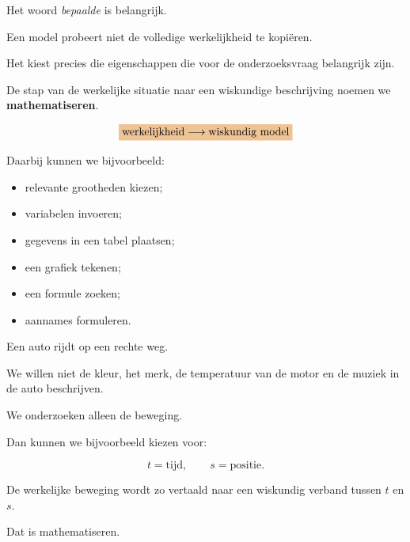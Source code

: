 \documentclass{ximera}
\begin{document}
Het woord \emph{bepaalde} is belangrijk.

Een model probeert niet de volledige werkelijkheid te kopiëren.

Het kiest precies die eigenschappen die voor de onderzoeksvraag
belangrijk zijn.




De stap van de werkelijke situatie naar een wiskundige beschrijving
noemen we \textbf{mathematiseren}.

\[
\important{
\text{werkelijkheid}
\longrightarrow
\text{wiskundig model}
}
\]

Daarbij kunnen we bijvoorbeeld:

\begin{itemize}
  \item relevante grootheden kiezen;
  \item variabelen invoeren;
  \item gegevens in een tabel plaatsen;
  \item een grafiek tekenen;
  \item een formule zoeken;
  \item aannames formuleren.
\end{itemize}


\begin{voorbeeld}

Een auto rijdt op een rechte weg.

We willen niet de kleur, het merk, de temperatuur van de motor en de
muziek in de auto beschrijven.

We onderzoeken alleen de beweging.

Dan kunnen we bijvoorbeeld kiezen voor:

\[
t=\text{tijd},
\qquad
s=\text{positie}.
\]

De werkelijke beweging wordt zo vertaald naar een wiskundig verband
tussen $t$ en $s$.

Dat is mathematiseren.

\end{voorbeeld}



\end{document}

